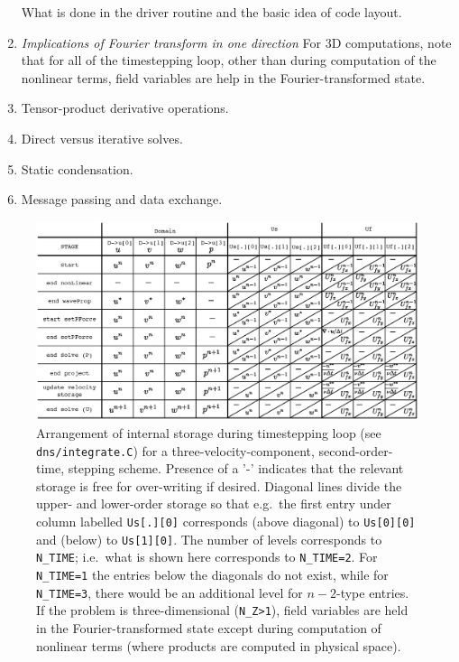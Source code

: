 \documentclass[11pt,a4paper]{report}
\begin{document}
\begin{enumerate}
What is done in the driver routine and the basic idea of code layout.
\item
\textsl{Implications of Fourier transform in one direction} For 3D
computations, note that for all of the timestepping loop, other than
during computation of the nonlinear terms, field variables are help in
the Fourier-transformed state.
\item
Tensor-product derivative operations.
\item
Direct versus iterative solves.
\item
Static condensation.
\item
Message passing and data exchange.
\end{enumerate}

\begin{figure}
\begin{center}
\includegraphics[viewport=72 130 770 492,width=\textwidth,clip=true]
{timeSchemeStorage.eps}
\end{center}
\caption{Arrangement of internal storage during timestepping loop (see
  \texttt{dns/integrate.C}) for a three-velocity-component,
  second-order-time, stepping scheme. Presence of a '-' indicates that
  the relevant storage is free for over-writing if desired.  Diagonal
  lines divide the upper- and lower-order storage so that e.g.\ the
  first entry under column labelled \texttt{Us[.][0]} corresponds
  (above diagonal) to \texttt{Us[0][0]} and (below) to
  \texttt{Us[1][0]}.
%
  The number of levels corresponds to
  \texttt{N\_TIME}; i.e.\ what is shown here corresponds to
  \texttt{N\_TIME=2}.  For \texttt{N\_TIME=1} the entries below the
  diagonals do not exist, while for \texttt{N\_TIME=3}, there would be
  an additional level for $n-2$-type entries.
%
  If the problem is three-dimensional (\texttt{N\_Z>1}), field
  variables are held in the Fourier-transformed state except during
  computation of nonlinear terms (where products are computed in
  physical space). }
\label{fig.storage}
\end{figure}
\end{document}

